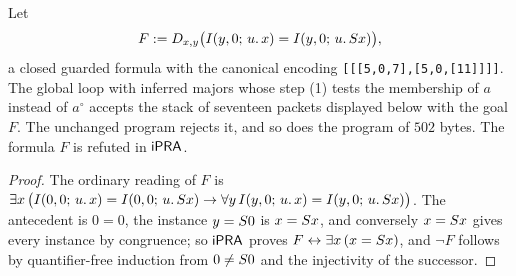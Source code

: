 \begin{proposition}\label{cert:prop:entry-scan}
Let
\[
F\mathrel{:=}D_{x,y}\bigl(I(y,0;\,u.\,x)=I(y,0;\,u.\,S x)\bigr),
\]
a closed guarded formula with the canonical encoding
\texttt{[[[5,0,7],[5,0,[11]]]]}. The global loop with inferred majors whose
step (1) tests the membership of $a$ instead of $a^{\circ}$ accepts the stack
of seventeen packets displayed below with the goal $F$. The unchanged program
rejects it, and so does the program of $502$ bytes. The formula $F$ is refuted
in $\mathsf{iPRA}$.
\end{proposition}
\begin{proof}
The ordinary reading of $F$ is
$\exists x\,\bigl(I(0,0;\,u.\,x)=I(0,0;\,u.\,S x)\to\forall y\,
I(y,0;\,u.\,x)=I(y,0;\,u.\,S x)\bigr)$. The antecedent is $0=0$, the
instance $y=S 0$ is $x=S x$, and conversely $x=S x$ gives every
instance by congruence; so $\mathsf{iPRA}$ proves $F\leftrightarrow\exists x\,(x=S x)$,
and $\neg F$ follows by quantifier-free induction from $0\neq S 0$ and the
injectivity of the successor.


\end{proof}

